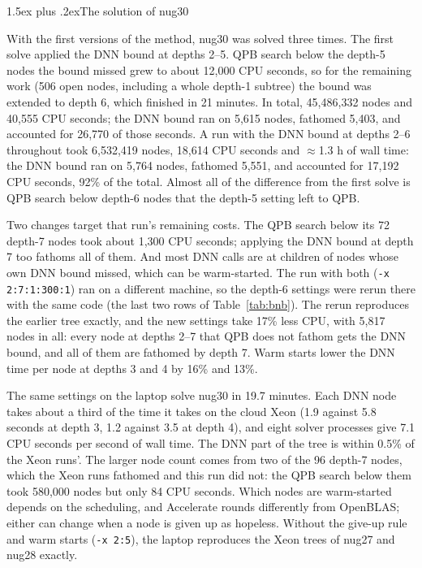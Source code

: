 \documentclass[10pt]{article}
\makeatletter
\renewcommand\subsection{\@startsection{subsection}{2}{\z@}{-3.25ex plus -1ex minus -.2ex}%
  {1.5ex plus .2ex}{\normalfont\normalsize\bfseries}}
\theoremstyle{remark}
\newcommand{\CleanNodes}{6,532,419}
\newcommand{\CleanCPU}{18,614}
\newcommand{\CleanWall}{$\approx$1.3 h}
\makeatother
\begin{document}
\subsection{The solution of nug30}

With the first versions of the method, nug30 was solved three times. The first
solve applied the DNN bound at depths 2--5.
QPB search below the depth-5 nodes the bound missed grew to about 12,000 CPU
seconds, so for the remaining work (506 open nodes, including a whole depth-1
subtree) the bound was extended to depth 6, which finished in 21 minutes. In total,
45,486,332 nodes and 40,555 CPU seconds; the DNN bound ran on 5,615 nodes, fathomed
5,403, and accounted for 26,770 of those seconds. A run with the DNN bound at depths
2--6 throughout took \CleanNodes{} nodes, \CleanCPU{} CPU seconds and \CleanWall{}
of wall time: the DNN bound ran on 5,764 nodes, fathomed 5,551, and accounted for
17,192 CPU seconds, 92\% of the total. Almost all of the difference from the first
solve is QPB search below depth-6 nodes that the depth-5 setting left to QPB.

Two changes target that run's remaining costs. The QPB search below its 72 depth-7
nodes took about 1,300 CPU seconds; applying the DNN bound at depth 7 too fathoms all
of them. And most DNN calls are at children of nodes whose own DNN bound missed,
which can be warm-started. The run with both (\texttt{-x 2:7:1:300:1}) ran on a
different machine, so the depth-6 settings were rerun there with the same code (the
last two rows of Table~\ref{tab:bnb}). The rerun reproduces the earlier tree exactly,
and the new settings take 17\% less CPU, with 5,817 nodes in all: every node at
depths 2--7 that QPB does not fathom gets the DNN bound, and all of them are
fathomed by depth 7. Warm starts lower the DNN time per node at depths 3 and 4 by
16\% and 13\%.

The same settings on the laptop solve nug30 in 19.7 minutes. Each DNN node takes
about a third of the time it takes on the cloud Xeon (1.9 against 5.8 seconds at
depth 3, 1.2 against 3.5 at depth 4), and eight solver processes give 7.1 CPU seconds
per second of wall time. The DNN part of the tree is within 0.5\% of the Xeon runs'.
The larger node count comes from two of the 96 depth-7 nodes, which the Xeon runs
fathomed and this run did not: the QPB search below them took 580,000 nodes but only
84 CPU seconds. Which nodes are warm-started depends on the scheduling, and
Accelerate rounds differently from OpenBLAS; either can change when a node is given
up as hopeless. Without the give-up rule and warm starts (\texttt{-x 2:5}), the
laptop reproduces the Xeon trees of nug27 and nug28 exactly.
\end{document}
